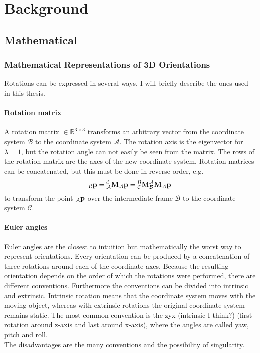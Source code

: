\chapter{Background}
\label{ch:Background}

\section{Mathematical}
\subsection{Mathematical Representations of 3D Orientations}
Rotations can be expressed in several ways, I will briefly describe the ones used in this thesis.

\subsubsection{Rotation matrix}
A rotation matrix  $\in \mathbb{R}^{3\times3}$ transforms an arbitrary vector from the coordinate system $\mathcal{B}$ to the coordinate system $\mathcal{A}$.
The rotation axis is the eigenvector for $\lambda = 1$, but the rotation angle can not easily be seen from the matrix.
The rows of the rotation matrix are the axes of the new coordinate system.
Rotation matrices can be concatenated, but this must be done in reverse order, e.g.
\begin{equation}
	{}_\mathcal{C}\vb{p} = \mtf{c}{a}{}_\mathcal{A}\vb{p} = \mtf{b}{c}\mtf{a}{b}{}_\mathcal{A}\vb{p}
\end{equation}
to transform the point ${}_\mathcal{A}\vb{p}$ over the intermediate frame $\mathcal{B}$ to the coordinate system $\mathcal{C}$.

\subsubsection{Euler angles}
Euler angles are the closest to intuition but mathematically the worst way to represent orientations.
Every orientation can be produced by a concatenation of three rotations around each of the coordinate axes.
Because the resulting orientation depends on the order of which the rotations were performed, there are different conventions.
Furthermore the conventions can be divided into intrinsic and extrinsic.
Intrinsic rotation means that the coordinate system moves with the moving object, whereas with extrinsic rotations the original coordinate system remains static.
The most common convention is the zyx (intrinsic I think?) (first rotation around z-axis and last around x-axis), where the angles are called yaw, pitch and roll.\\
The disadvantages are the many conventions and the possibility of singularity.


